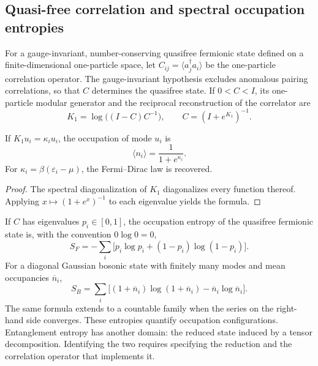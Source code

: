 \subsection{Quasi-free correlation and spectral occupation entropies}

For a gauge-invariant, number-conserving quasifree fermionic state
defined on a finite-dimensional one-particle space, let
\(C_{ij}=\langle a_j^\dagger a_i\rangle\) be the one-particle correlation
operator. The gauge-invariant hypothesis excludes anomalous pairing
correlations, so that \(C\) determines the quasifree state. If
\(0<C<I\), its one-particle modular generator and the reciprocal reconstruction
of the correlator are
\begin{equation}
 \boxed{
 K_1=\log\bigl((I-C)C^{-1}\bigr),
 \qquad
 C=(I+e^{K_1})^{-1}.}
 \label{eq:puente-cuasilibre-modular-rev3}
\end{equation}

\begin{corollary}
\label{cor:forma-logistica-modular-rev3}
If \(K_1u_i=\kappa_i u_i\), the occupation of mode \(u_i\) is
\[
 \langle n_i\rangle=\frac1{1+e^{\kappa_i}}.
\]
For \(\kappa_i=\beta(\varepsilon_i-\mu)\), the Fermi--Dirac law
is recovered.
\end{corollary}

\begin{proof}
The spectral diagonalization of \(K_1\) diagonalizes every function thereof. Applying
\(x\mapsto(1+e^x)^{-1}\) to each eigenvalue yields the formula.
\end{proof}

If \(C\) has eigenvalues \(p_i\in[0,1]\), the occupation entropy of the
quasifree fermionic state is, with the convention \(0\log0=0\),
\begin{equation}
 S_F=-\sum_i\bigl[p_i\log p_i+(1-p_i)\log(1-p_i)\bigr].
 \label{eq:entropia-cuasilibre-fermi-rev3}
\end{equation}
For a diagonal Gaussian bosonic state with finitely many modes and mean
occupancies \(\overline n_i\),
\begin{equation}
 S_B=\sum_i\bigl[(1+\overline n_i)\log(1+\overline n_i)
                  -\overline n_i\log\overline n_i\bigr].
 \label{eq:entropia-gaussiana-bose-rev3}
\end{equation}
The same formula extends to a countable family when the series on the
right-hand side converges.
These entropies quantify occupation configurations. Entanglement entropy
has another domain: the reduced state induced by a tensor
decomposition. Identifying the two requires specifying the reduction and the
correlation operator that implements it.

